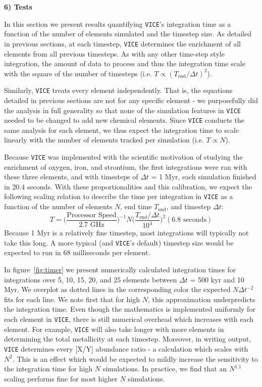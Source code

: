 \documentclass{report}
\begin{document}
\null\par\noindent
\hypertarget{sec:tests}{\textbf{6) Tests}} \par\noindent 
In this section we present results quantifying \texttt{VICE}'s integration 
time as a function of the number of elements simulated and the timestep size. 
As detailed in previous sections, at each timestep, \texttt{VICE} determines 
the enrichment of all elements from all previous timesteps. As with any 
other time-step style integration, the amount of data to process and thus 
the integration time scale with the square of the number of timesteps 
(i.e. $T \propto (T_\text{end}/\Delta t)^2$). 
\par
Similarly, \texttt{VICE} treats every element independently. That is, the 
equations detailed in previous sections are not for any specific element - we 
purposefully did the analysis in full generality so that none of the 
simulation features in \texttt{VICE} needed to be changed to add new chemical 
elements. Since \texttt{VICE} conducts the same analysis for each element, 
we thus expect the integration time to scale linearly with the number of 
elements tracked per simulation (i.e. $T \propto N$). 
\par
Because \texttt{VICE} was implemented with the scientific motivation of 
studying the enrichment of oxygen, iron, and strontium, the first integrations 
were ran with these three elements, and with timesteps of $\Delta t$ = 1 Myr, 
each simulation finished in 20.4 seconds. With these proportionalities and 
this calibration, we expect the following scaling relation to describe the 
time per integration in \texttt{VICE} as a function of the number of 
elements $N$, end time $T_\text{end}$, and timestep $\Delta t$: 
\begin{equation}
T = \Big(\frac{\text{Processor Speed}}{2.7\text{ GHz}}\Big)^{-1}
N\Big(\frac{T_\text{end}/\Delta t}{10^4}\Big)^2(6.8\text{ seconds})
\end{equation}
Because 1 Myr is a relatively fine timestep, most integrations will typically 
not take this long. A more typical (and \texttt{VICE}'s default) timestep size 
would be expected to run in 68 milliseconds per element. 
\par
In figure~\ref{fig:timer} we present numerically calculated integration times 
for integrations over 5, 10, 15, 20, and 25 elements between $\Delta t$ = 
500 kyr and 10 Myr. We overplot as dotted lines in the corresponding color the 
expected $N\Delta t^{-2}$ fits for each line. We note first that for high 
$N$, this approximation underpredicts the integration time. Even though the 
mathematics is implemented uniformly for each element in \texttt{VICE}, there 
is still numerical overhead which increases with each element. For example, 
\texttt{VICE} will also take longer with more elements in determining the total 
metallicity at each timestep. Moreover, in writing output, \texttt{VICE} 
determines every [X/Y] abundance ratio - a calculation which scales with 
$N^2$. This is an effect which would be expected to mildly increase the 
sensitivity to the integration time for high $N$ simulations. In practice, we 
find that an $N^{1.1}$ scaling performs fine for most higher $N$ simulations. 
\end{document}
